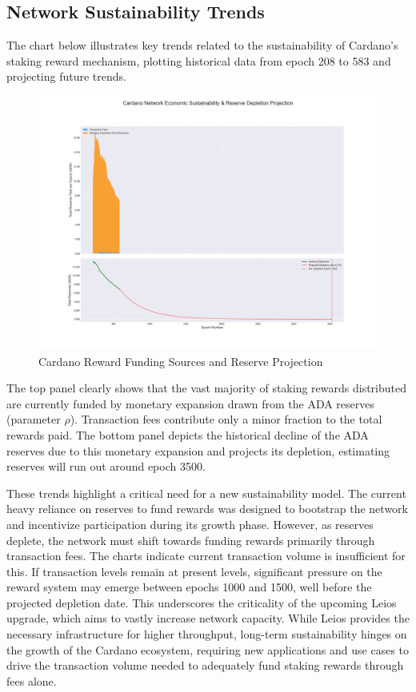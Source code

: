 \documentclass[11pt, letterpaper]{article}
\begin{document}
\subsection{Network Sustainability Trends}

The chart below illustrates key trends related to the sustainability of Cardano's staking reward mechanism, plotting historical data from epoch 208 to 583 and projecting future trends.

\begin{figure}[H]
	\centering
	\includegraphics[width=\textwidth]{img/sustainability_trends_with_projection_208-583.png}
	\caption{Cardano Reward Funding Sources and Reserve Projection}
	\label{fig:sustainability_trends}
\end{figure}

The top panel clearly shows that the vast majority of staking rewards distributed are currently funded
by monetary expansion drawn from the ADA reserves (parameter $\rho$). Transaction fees contribute only a
minor fraction to the total rewards paid. The bottom panel depicts the historical decline of the ADA reserves
due to this monetary expansion and projects its depletion, estimating reserves will run out around epoch 3500.

These trends highlight a critical need for a new sustainability model. The current heavy reliance
on reserves to fund rewards was designed to bootstrap the network and incentivize
participation during its growth phase. However, as reserves deplete, the network must shift
towards funding rewards primarily through transaction fees. The charts indicate current transaction volume
is insufficient for this. If transaction levels remain at present levels, significant pressure on the reward
system may emerge between epochs 1000 and 1500, well before the projected depletion date. This underscores
the criticality of the upcoming Leios upgrade, which aims to  vastly increase network capacity. While Leios
provides the necessary infrastructure for higher throughput, long-term sustainability hinges on the growth
of the Cardano ecosystem, requiring new applications and use cases to drive the transaction volume
needed to adequately fund staking rewards through fees alone.
\end{document}
